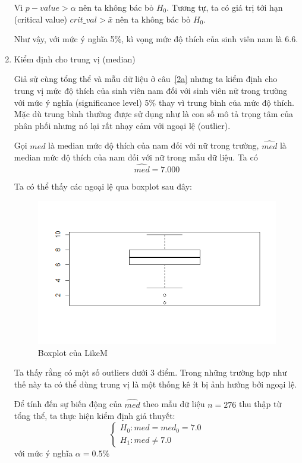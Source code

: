 \documentclass[a4paper,12pt]{article}
\begin{document}
\begin{enumerate}[label = \alph*)]
		Vì $p-value > \alpha$ nên ta không bác bỏ $H_0$. Tương tự, ta có giá trị tới hạn (critical value) $crit\_val > \bar{x}$ nên ta không bác bỏ $H_0$. 
		
		Như vậy, với mức ý nghĩa 5\%, kì vọng mức độ thích của sinh viên nam là $6.6$. 
		
		\item Kiểm định cho trung vị (median)
		
		Giả sử cùng tổng thể và mẫu dữ liệu ở câu~\ref{2a} nhưng ta kiểm định cho trung vị mức độ thích của sinh viên nam đối với sinh viên nữ trong trường với mức ý nghĩa (significance level) 5\% thay vì trung bình của mức độ thích. Mặc dù trung bình thường được sử dụng như là con số mô tả trọng tâm của phân phối nhưng nó lại rất nhạy cảm với ngoại lệ (outlier).
		
		Gọi $med$ là median mức độ thích của nam đối với nữ trong trường, $\hat{med}$ là median mức độ thích của nam đối với nữ trong mẫu dữ liệu. Ta có
		$$\hat{med} = 7.000$$
		
		Ta có thể thấy các ngoại lệ qua boxplot sau đây:
		\begin{figure}[H]
			\centering
			\includegraphics[width=0.7\linewidth]{Rplot1}
			\caption{Boxplot của LikeM}
			\label{fig:rplot1}
		\end{figure}
		
		Ta thấy rằng có một số outliers dưới 3 điểm. Trong những trường hợp như thế này ta có thể dùng trung vị là một thống kê ít bị ảnh hưởng bởi ngoại lệ.
		
		Để tính đến sự biến động của $\hat{med}$ theo mẫu dữ liệu $n = 276$ thu thập từ tổng thể, ta thực hiện kiểm định giả thuyết:
		\begin{equation*}
		\begin{cases}
		H_0: med = med_0 = 7.0\\
		H_1: med \neq 7.0
		\end{cases}
		\end{equation*}
		với mức ý nghĩa $\alpha = 0.5\%$
		

\end{enumerate}
\end{document}
